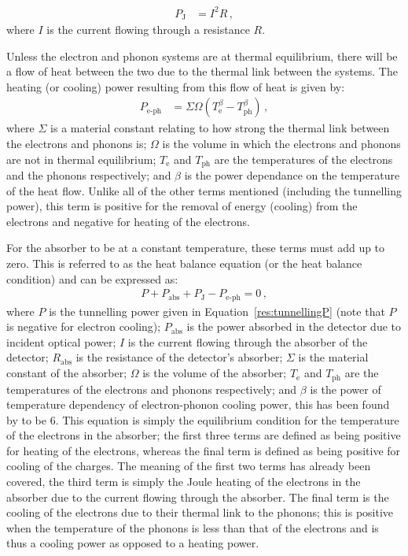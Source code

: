 \begin{align}
P_{\mathrm{J}} &= I^{2}R\,, \label{def:JouleHeating}
\end{align}
where $I$ is the current flowing through a resistance $R$.
\par 
Unless the electron and phonon systems are at thermal equilibrium, there will be a flow of heat between the two due to the thermal link between the systems. The heating (or cooling) power resulting from this flow of heat is given by:
\begin{align}
P_{\mathrm{e\mbox{-}ph}} &= \varSigma \varOmega\left(T_{\mathrm{e}}^{\beta} 
	- T_{\mathrm{ph}}^{\beta}\right)\,, \label{def:e-phPower}
\end{align}
where $\varSigma$ is a material constant relating to how strong the thermal link between the electrons and phonons is; $\varOmega$ is the volume in which the electrons and phonons are not in thermal equilibrium; $T_{\mathrm{e}}$ and $T_{\mathrm{ph}}$ are the temperatures of the electrons and the phonons respectively; and $\beta$ is the power dependance on the temperature of the heat flow. Unlike all of the other terms mentioned (including the tunnelling power), this term is positive for the removal of energy (cooling) from the electrons and negative for heating of the electrons.
\par 
For the absorber to be at a constant temperature, these terms must add up to zero. This is referred to as the heat balance equation (or the heat balance condition) and can be expressed as:
\begin{align}
P + P_{\mathrm{abs}} + P_{\mathrm{J}} - P_{\mathrm{e\mbox{-}ph}} = 0 \,, \label{eqn:heatBalance}
\end{align}
where $P$ is the tunnelling power given in Equation~\ref{res:tunnellingP} (note that $P$ is negative for electron cooling); $P_{\mathrm{abs}}$ is the power absorbed in the detector due to incident optical power; $I$ is the current flowing through the absorber of the detector; $R_{\mathrm{abs}}$ is the resistance of the detector's absorber; $\varSigma$ is the material constant of the absorber; $\varOmega$ is the volume of the absorber; $T_{\mathrm{e}}$ and $T_{\mathrm{ph}}$ are the temperatures of the electrons and phonons respectively; and $\beta$ is the power of temperature dependency of electron-phonon cooling power, this has been found by \textcite{Prest2011} to be $6$. This equation is simply the equilibrium condition for the temperature of the electrons in the absorber; the first three terms are defined as being positive for heating of the electrons, whereas the final term is defined as being positive for cooling of the charges. The meaning of the first two terms has already been covered, the third term is simply the Joule heating of the electrons in the absorber due to the current flowing through the absorber. The final term is the cooling of the electrons due to their thermal link to the phonons; this is positive when the temperature of the phonons is less than that of the electrons and is thus a cooling power as opposed to a heating power.
